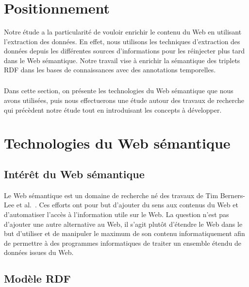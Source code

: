 \section{Positionnement}
\paragraph{}
Notre étude a la particularité de vouloir enrichir le contenu du Web en utilisant l'extraction des données. 
En effet, nous utilisons les techniques d'extraction des données depuis les différentes sources d'informations pour les réinjecter plus tard dans le Web sémantique. Notre travail vise à enrichir la sémantique des triplets RDF dans les bases de connaissances avec des annotations temporelles.
\subparagraph{}
Dans cette section, on présente les technologies du Web sémantique que nous avons utilisées, puis nous effectuerons une étude autour des travaux de recherche qui précèdent notre étude tout en introduisant les concepts à développer.
\section{Technologies du Web sémantique}
\subsection{Intérêt du Web sémantique}
\paragraph{}
Le Web sémantique est un domaine de recherche né des travaux de Tim Berners-Lee et al.~\cite{Berners-lee2001}. Ces efforts ont pour but d'ajouter du sens aux contenus du Web et d'automatiser l'accès à l'information utile sur le Web. La question n’est pas d'ajouter une autre alternative au Web, il s’agit plutôt d'étendre le Web dans le but d'utiliser et de manipuler le maximum de son contenu informatiquement afin de permettre à des programmes informatiques de traiter un ensemble étendu de données issues du Web.
\subsection{Modèle RDF}
